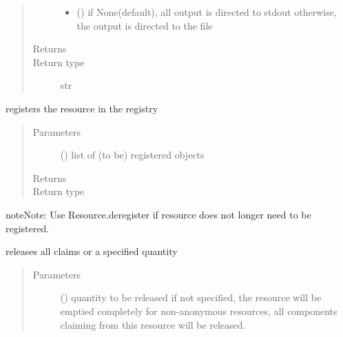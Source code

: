 \documentclass[letterpaper,10pt,english]{sphinxmanual}
\begin{document}
\begin{fulllineitems}
\begin{fulllineitems}
\begin{quote}
\begin{description}
\begin{itemize}
\item {} 
 () \textendash{} if None(default), all output is directed to stdout 
otherwise, the output is directed to the file

\end{itemize}

\item[{Returns}] \leavevmode
{}

\item[{Return type}] \leavevmode
str

\end{description}\end{quote}

\end{fulllineitems}


\begin{fulllineitems}
\label{\detokenize{Reference:salabim.Resource.register}}
registers the resource in the registry
\begin{quote}\begin{description}
\item[{Parameters}] \leavevmode
{} () \textendash{} list of (to be) registered objects

\item[{Returns}] \leavevmode
{}

\item[{Return type}] \leavevmode
{\hyperref[\detokenize{Reference:salabim.Resource}]{}}

\end{description}\end{quote}

\begin{sphinxadmonition}{note}{Note:}
Use Resource.deregister if resource does not longer need to be registered.
\end{sphinxadmonition}

\end{fulllineitems}


\begin{fulllineitems}
\label{\detokenize{Reference:salabim.Resource.release}}
releases all claims or a specified quantity
\begin{quote}\begin{description}
\item[{Parameters}] \leavevmode
{} () \textendash{} quantity to be released 
if not specified, the resource will be emptied completely 
for non-anonymous resources, all components claiming from this resource
will be released.


\end{description}
\end{quote}
\end{fulllineitems}
\end{fulllineitems}
\end{document}
